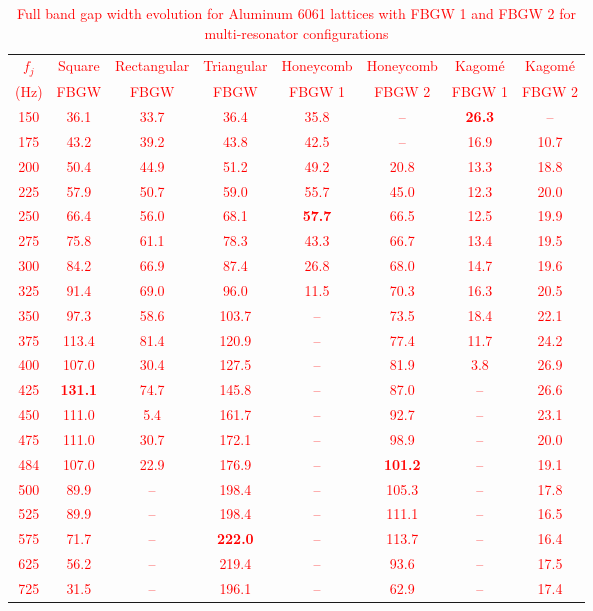\documentclass[review,numbers,sort&compress]{elsarticle}
\begin{document}
\textcolor{red}{\begin{table}[!htb]
\centering
\caption{Full band gap width evolution for Aluminum 6061 lattices with FBGW 1 and FBGW 2 for multi-resonator configurations\protect\footnotemark[1]}
\label{tab:aluminum_results}
\small
\begin{tabular}{cccccccc}
\hline
$f_j$ & Square & Rectangular & Triangular & Honeycomb & Honeycomb & Kagom\'{e} & Kagom\'{e} \\
(Hz) & FBGW & FBGW & FBGW & FBGW 1 & FBGW 2 & FBGW 1 & FBGW 2 \\
\hline
150 & 36.1 & 33.7 & 36.4 & 35.8 & -- & \textbf{26.3} & -- \\
175 & 43.2 & 39.2 & 43.8 & 42.5 & -- & 16.9 & 10.7 \\
200 & 50.4 & 44.9 & 51.2 & 49.2 & 20.8 & 13.3 & 18.8 \\
225 & 57.9 & 50.7 & 59.0 & 55.7 & 45.0 & 12.3 & 20.0 \\
250 & 66.4 & 56.0 & 68.1 & \textbf{57.7} & 66.5 & 12.5 & 19.9 \\
275 & 75.8 & 61.1 & 78.3 & 43.3 & 66.7 & 13.4 & 19.5 \\
300 & 84.2 & 66.9 & 87.4 & 26.8 & 68.0 & 14.7 & 19.6 \\
325 & 91.4 & 69.0 & 96.0 & 11.5 & 70.3 & 16.3 & 20.5 \\
350 & 97.3 & 58.6 & 103.7 & -- & 73.5 & 18.4 & 22.1 \\
375 & 113.4 & 81.4 & 120.9 & -- & 77.4 & 11.7 & 24.2 \\
400 & 107.0 & 30.4 & 127.5 & -- & 81.9 & 3.8 & 26.9 \\
425 & \textbf{131.1} & 74.7 & 145.8 & -- & 87.0 & -- & 26.6 \\
450 & 111.0 & 5.4 & 161.7 & -- & 92.7 & -- & 23.1 \\
475 & 111.0 & 30.7 & 172.1 & -- & 98.9 & -- & 20.0 \\
484\protect\footnotemark[2] & 107.0 & 22.9 & 176.9 & -- & \textbf{101.2} & -- & 19.1 \\
500 & 89.9 & -- & 198.4 & -- & 105.3 & -- & 17.8 \\
525 & 89.9 & -- & 198.4 & -- & 111.1 & -- & 16.5 \\
575 & 71.7 & -- & \textbf{222.0} & -- & 113.7 & -- & 16.4 \\
625 & 56.2 & -- & 219.4 & -- & 93.6 & -- & 17.5 \\
725 & 31.5 & -- & 196.1 & -- & 62.9 & -- & 17.4 \\
\hline
\end{tabular}
\end{table}}
\end{document}
